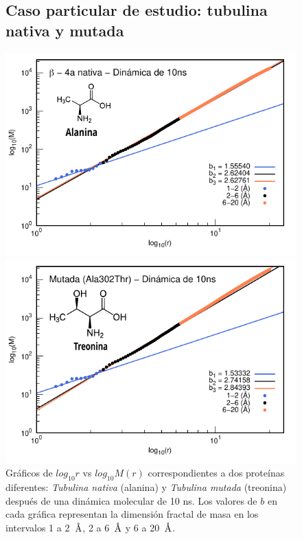 	\begin{figure}[H]
		\subsection*{Caso particular de estudio: tubulina nativa y mutada}	
		\hspace{-0.3cm} 
		\begin{minipage}{0.49\textwidth}
			\centering
			\includegraphics[width=\linewidth,page=1]{graphs/PDBs/Tubb4/TubNat10ns.pdf}
		\end{minipage}
		\hspace{0.2cm}
		\begin{minipage}{0.49\textwidth}
			\centering
			\includegraphics[width=\linewidth,page=1]{graphs/PDBs/Tubb4/TubMut10ns.pdf}
		\end{minipage}
		
		
		\caption{
			Gr\'{a}ficos de $log_{10}r$ vs $log_{10}M(r)$ correspondientes a dos prote\'{i}nas diferentes: \textit{Tubulina nativa} (alanina) y \textit{Tubulina mutada} (treonina) despu\'{e}s de una din\'{a}mica molecular de 10 ns. Los valores de $b$ en cada gr\'{a}fica representan la dimensi\'{o}n fractal de masa en los intervalos 1 a 2~$\textup{\r{A}}$, 2 a 6~$\textup{\r{A}}$ y 6 a 20~$\textup{\r{A}}$.}
		\label{fig:Tubs}
	\end{figure}
	
